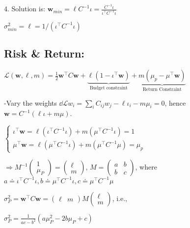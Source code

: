 4. Solution is: $\pmb{w}_{min} = \ell C^{-1}\iota = \frac{C^{-1}\iota}{\iota^\top C^{-1}\iota}$

$\sigma_{min}^2 = \ell = 1/(\iota^\top C^{-1} \iota)$




\subsection{Risk \& Return:}

$\mathcal{L}(\pmb{w}, \ell, m) = \frac{1}{2}\pmb{w}^\top C \pmb{w} + \underbrace{\ell(1-\iota^{\top}\pmb{w})}_{\text{Budget constraint}} +  \underbrace{m(\mu_p -\mu^\top\pmb{w})}_{\text{Return Constraint}}$ 

-Vary the weights $\dd{\mathcal{L}}{w_i}= \sum_i C_{ij}w_j - \ell\iota_i - m \mu_i = 0$, hence $\pmb{w} = C^{-1}(\ell\iota +m\mu)$.


$\begin{cases}\iota^\top \pmb{w} = \ell(\iota^\top C^{-1}\iota) + m(\mu^\top C ^{-1}\iota)= 1\\ \mu^\top \pmb{w} = \ell(\mu^\top C^{-1}\iota) + m(\mu^\top C ^{-1}\mu)= \mu_p
\end{cases}$


$\Rightarrow M^{-1} \begin{pmatrix} 1 \\ \mu_P\end{pmatrix} = \begin{pmatrix} \ell \\ m \end{pmatrix}$, $M = \begin{pmatrix} a & b \\ b & c\end{pmatrix}$, where $a\doteq \iota^\top C^{-1} \iota, b\doteq \mu^\top C^{-1} \iota, c\doteq \mu^{\top} C^{-1}\mu $

$\sigma^2_P = \pmb{w}^\top C \pmb{w} = \begin{pmatrix} \ell & m\end{pmatrix} M \begin{pmatrix} \ell \\ m\end{pmatrix}$, i.e., 

$\sigma^2_P = \frac{1}{ac - b^2}(a \mu_P^2 -2b\mu_P + c)$




